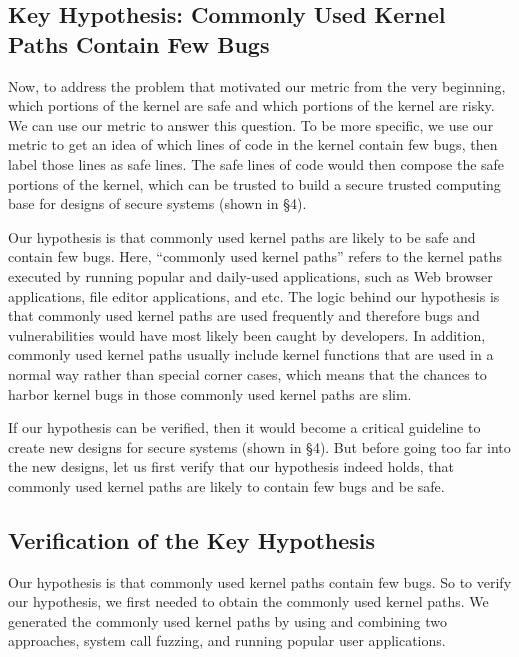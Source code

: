 \subsection{Key Hypothesis: Commonly Used Kernel Paths Contain Few Bugs}
Now, to address the problem that motivated our metric from the very beginning, which portions of the kernel 
are safe and which portions of the kernel are risky. We can use our metric to answer this question. To be more
specific, we use our metric to get an idea of which lines of code in the kernel contain few bugs, then label 
those lines as safe lines. The safe lines of code would then compose the safe portions of the kernel, which can 
be trusted to build a secure trusted computing base for designs of secure systems (shown in \S{4}). 

Our hypothesis is that commonly used kernel paths are likely to be safe and contain few bugs. 
Here, ``commonly used kernel paths'' refers to the kernel paths executed by running popular and 
daily-used applications, such as Web browser applications, file editor applications, and etc. 
The logic behind our hypothesis is that commonly used kernel paths are used
frequently and therefore bugs and vulnerabilities would have most likely
been caught by developers.  In addition, commonly used kernel paths usually 
include kernel functions that are used in a normal way rather than special 
corner cases, which means that the chances 
to harbor kernel bugs in those commonly used kernel paths are slim. 

If our hypothesis can be verified, then it would become a critical guideline to create new designs for secure systems 
(shown in \S{4}). 
But before going too far into the new designs, let us first verify that our hypothesis indeed holds, that 
commonly used kernel paths are likely to contain few bugs and be safe. 

\subsection{Verification of the Key Hypothesis}
Our hypothesis is that commonly used kernel paths contain few bugs. 
So to verify our hypothesis, we first needed to obtain the commonly used kernel paths. 
We generated the commonly used kernel paths by using and combining two approaches, 
system call fuzzing, and running popular user applications.  

